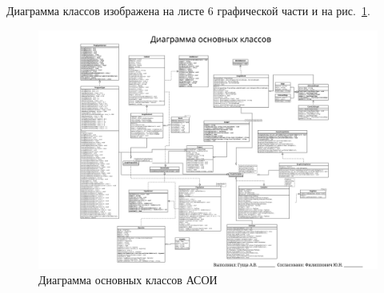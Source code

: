 \documentclass[russian,utf8,emptystyle]{eskdtext}
\begin{document}
\begin{spacing}{1.5}
Диаграмма классов изображена на листе 6 графической части и на рис.~\ref{fig:classDiagram}.

\begin{figure}[h!]
\centering
\includegraphics[width=1.3\textwidth, angle=90]{list6}
\caption{Диаграмма основных классов АСОИ}
\label{fig:classDiagram}
\end{figure}


\end{spacing}
\end{document}
